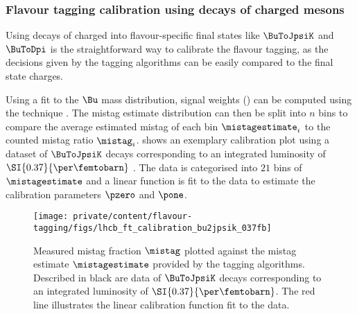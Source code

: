 \subsubsection[Flavour tagging calibration using decays of charged \Bmesons]{Flavour tagging calibration using decays of charged \Bbfsf mesons}
\label{sec:flavour_tagging:calibration:method:charged}

Using decays of charged \Bmesons into flavour-specific final states like
$\BuToJpsiK$ and $\BuToDpi$ is the straightforward way to calibrate the flavour
tagging, as the decisions given by the tagging algorithms can be easily compared
to the final state charges.

Using a fit to the $\Bu$ mass distribution, signal weights (\sweights) can be
computed using the \sPlot technique \cite{Pivk:2004ty}. The mistag estimate
distribution can then be split into $n$ bins to compare the average estimated
mistag of each bin $\mistagestimate_i$ to the counted mistag ratio $\mistag_i$.
 shows an
exemplary calibration plot using a dataset of $\BuToJpsiK$ decays corresponding
to an integrated luminosity of $\SI{0.37}{\per\femtobarn}$ \cite{Aaij:2012mu}.
The data is categorised into $\num{21}$ bins of $\mistagestimate$ and a linear
function is fit to the data to estimate the calibration parameters $\pzero$ and
$\pone$.
%
\begin{figure}
\centering
\texttt{[image: private/content/flavour-tagging/figs/lhcb\_ft\_calibration\_bu2jpsik\_037fb]}
\caption{Measured mistag fraction $\mistag$ plotted against the mistag estimate
$\mistagestimate$ provided by the \OS tagging algorithms. Described in black are
data of $\BuToJpsiK$ decays corresponding to an integrated luminosity of
$\SI{0.37}{\per\femtobarn}$. The red line illustrates the linear calibration
function fit to the data. \cite{Aaij:2012mu}}
\label{fig:flavour_tagging:calibration:method:charged:calibration_plot}
\end{figure}

